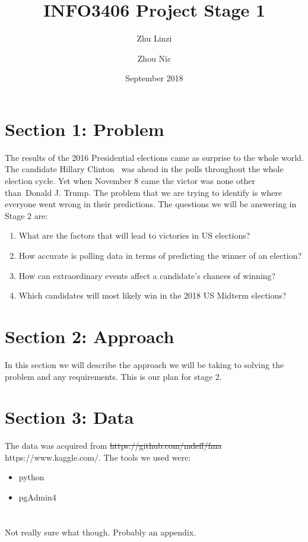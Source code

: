 \documentclass[12pt,a4paper]{article}
\begin{document}
\begin{titlepage}
    \title{INFO3406 Project Stage 1}
    \author{Zhu Linzi\\
            \and
            Zhou Nic
    }
    \date{September 2018}
    \maketitle
\end{titlepage}

    \pagebreak
    \tableofcontents
    \pagebreak

    \section{Section 1: Problem}
    The results of the 2016 Presidential elections came as surprise to the whole world. The candidate Hillary Clinton \
    was ahead in the polls throughout the whole election cycle. Yet when November 8 came the victor was none other than\
    Donald J. Trump. The problem that we are trying to identify is where everyone went wrong in their predictions.
    \newline \newline
    The questions we will be answering in Stage 2 are:

    \begin{enumerate}
        \item What are the factors that will lead to victories in US elections?
        \item How accurate is polling data in terms of predicting the winner of an election?
        \item How can extraordinary events affect a candidate's chances of winning?
        \item Which candidates will most likely win in the 2018 US Midterm elections?
    \end{enumerate}

    \section{Section 2: Approach}
    In this section we will describe the approach we will be taking to solving the problem and any requirements. This is our plan for stage 2.

    \section{Section 3: Data}

    The data was acquired from \st{https://github.com/mdeff/fma} https://www.kaggle.com/.
    \newline \newline
    The tools we used were:

    \begin{itemize}
        \item python
        \item pgAdmin4
    \end{itemize}
    \appendix
    \section{}
    Not really sure what though. Probably an appendix.
\end{document}
